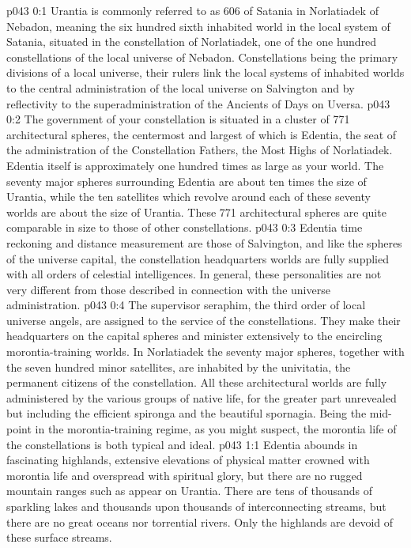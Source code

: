 \author{Malavatia Melchizedek}
\vs p043 0:1 Urantia is commonly referred to as 606 of Satania in Norlatiadek of Nebadon, meaning the six hundred sixth inhabited world in the local system of Satania, situated in the constellation of Norlatiadek, one of the one hundred constellations of the local universe of Nebadon. Constellations being the primary divisions of a local universe, their rulers link the local systems of inhabited worlds to the central administration of the local universe on Salvington and by reflectivity to the superadministration of the Ancients of Days on Uversa.\plusone
\pc \vs p043 0:2 The government of your constellation is situated in a cluster of 771 architectural spheres, the centermost and largest of which is Edentia, the seat of the administration of the Constellation Fathers, the Most Highs of Norlatiadek. Edentia itself is approximately one hundred times as large as your world. The seventy major spheres surrounding Edentia are about ten times the size of Urantia, while the ten satellites which revolve around each of these seventy worlds are about the size of Urantia. These 771 architectural spheres are quite comparable in size to those of other constellations.\plusone
\pc \vs p043 0:3 Edentia time reckoning and distance measurement are those of Salvington, and like the spheres of the universe capital, the constellation headquarters worlds are fully supplied with all orders of celestial intelligences. In general, these personalities are not very different from those described in connection with the universe administration.
\vs p043 0:4 The supervisor seraphim, the third order of local universe angels, are assigned to the service of the constellations. They make their headquarters on the capital spheres and minister extensively to the encircling morontia\hyp{}training worlds. In Norlatiadek the seventy major spheres, together with the seven hundred minor satellites, are inhabited by the univitatia, the permanent citizens of the constellation. All these architectural worlds are fully administered by the various groups of native life, for the greater part unrevealed but including the efficient spironga and the beautiful spornagia. Being the mid\hyp{}point in the morontia\hyp{}training regime, as you might suspect, the morontia life of the constellations is both typical and ideal.
\vs p043 1:1 Edentia abounds in fascinating highlands, extensive elevations of physical matter crowned with morontia life and overspread with spiritual glory, but there are no rugged mountain ranges such as appear on Urantia. There are tens of thousands of sparkling lakes and thousands upon thousands of interconnecting streams, but there are no great oceans nor torrential rivers. Only the highlands are devoid of these surface streams.
